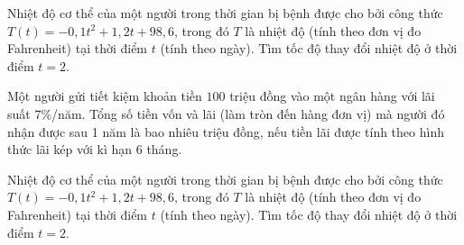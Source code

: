 

\begin{ex}%
	Nhiệt độ cơ thể của một người trong thời gian bị bệnh được cho bởi công thức \break$T(t)=-0{,}1t^2+1{,}2t+98{,}6$, trong đó $T$ là nhiệt độ (tính theo đơn vị đo Fahrenheit) tại thời điểm $t$ (tính  theo ngày). Tìm tốc độ thay đổi nhiệt độ ở thời điểm $t=2$.
\end{ex}

\begin{ex}%
	Một người gửi tiết kiệm khoản tiền $ 100 $ triệu đồng vào một ngân hàng với lãi suất $7 \% $/năm. Tổng số tiền vốn và lãi (làm tròn đến hàng đơn vị) mà người đó nhận được sau 1  năm là bao nhiêu triệu đồng, nếu tiền lãi được tính theo hình thức lãi kép với kì hạn 6 tháng.
\end{ex}



\begin{bt}%
	Nhiệt độ cơ thể của một người trong thời gian bị bệnh được cho bởi công thức \break$T(t)=-0{,}1t^2+1{,}2t+98{,}6$, trong đó $T$ là nhiệt độ (tính theo đơn vị đo Fahrenheit) tại thời điểm $t$ (tính theo ngày). Tìm  tốc độ thay đổi nhiệt độ ở thời điểm $t=2$.
\end{bt}

